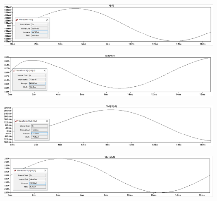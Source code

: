\documentclass[letterpaper]{article}
\begin{document}
\begin{figure}[H]
    \centering
    \includegraphics[width=\linewidth]{mesh-vr4}
\end{figure}
\begin{figure}[H]
    \centering
    \includegraphics[width=\linewidth]{mesh-vl}
\end{figure}
\begin{figure}[H]
    \centering
    \includegraphics[width=\linewidth]{mesh-vc}
\end{figure}
\begin{figure}[H]
    \centering
    \includegraphics[width=\linewidth]{mesh-vs}
\end{figure}
\end{document}
